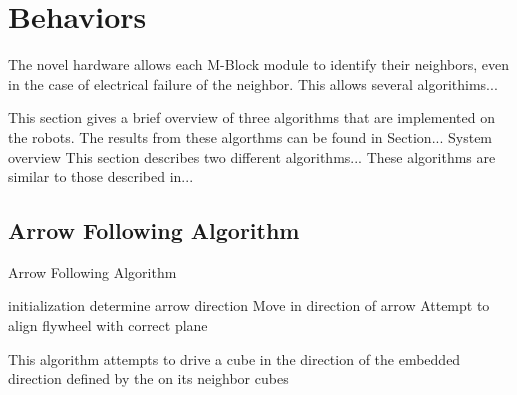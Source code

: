 \section{Behaviors}
\label{sec:Behaviors}

The novel hardware allows each M-Block module to identify their neighbors, even in the case of electrical failure of the
neighbor. This allows several algorithims...


This section gives a brief overview of three algorithms that are implemented on the robots. The results from these algorthms can be found in Section...
System overview
This section describes two different algorithms... These algorithms are similar to those described in...

\subsection{Arrow Following Algorithm}
\label{sec:algArrow}

%
	
\begin{algorithm}[ht] 
	\caption{Arrow Following Algorithm}
	\label{algorithmArrow}
	\SetAlgoLined
	initialization\;
	{
		determine arrow direction\;
		{
			Move in direction of arrow\;
		}
		{
			 Attempt to align flywheel with correct plane\;
		}
	}
	\caption{This algorithm attempts to drive a cube in the direction of the embedded direction defined by the \tagName on its neighbor cubes}

\end{algorithm}


